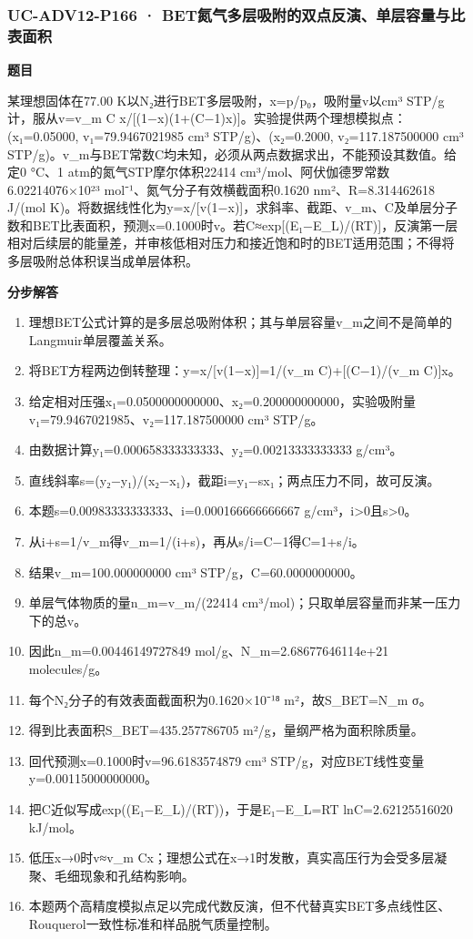 \documentclass[UTF8,11pt,a4paper]{ctexart}
\begin{document}
\subsubsection*{UC-ADV12-P166 · BET氮气多层吸附的双点反演、单层容量与比表面积}
\noindent\textbf{题目}\par
某理想固体在77.00 K以N₂进行BET多层吸附，x=p/p₀，吸附量v以cm³ STP/g计，服从v=v\_m C x/[(1−x)(1+(C−1)x)]。实验提供两个理想模拟点：(x₁=0.05000, v₁=79.9467021985 cm³ STP/g)、(x₂=0.2000, v₂=117.187500000 cm³ STP/g)。v\_m与BET常数C均未知，必须从两点数据求出，不能预设其数值。给定0 °C、1 atm的氮气STP摩尔体积22414 cm³/mol、阿伏伽德罗常数6.02214076×10²³ mol⁻¹、氮气分子有效横截面积0.1620 nm²、R=8.314462618 J/(mol K)。将数据线性化为y=x/[v(1−x)]，求斜率、截距、v\_m、C及单层分子数和BET比表面积，预测x=0.1000时v。若C≈exp[(E₁−E\_L)/(RT)]，反演第一层相对后续层的能量差，并审核低相对压力和接近饱和时的BET适用范围；不得将多层吸附总体积误当成单层体积。\par
\medskip\noindent\textbf{分步解答}
\begin{enumerate}
\item 理想BET公式计算的是多层总吸附体积；其与单层容量v\_m之间不是简单的Langmuir单层覆盖关系。
\item 将BET方程两边倒转整理：y=x/[v(1−x)]=1/(v\_m C)+[(C−1)/(v\_m C)]x。
\item 给定相对压强x₁=0.0500000000000、x₂=0.200000000000，实验吸附量v₁=79.9467021985、v₂=117.187500000 cm³ STP/g。
\item 由数据计算y₁=0.000658333333333、y₂=0.00213333333333 g/cm³。
\item 直线斜率s=(y₂−y₁)/(x₂−x₁)，截距i=y₁−sx₁；两点压力不同，故可反演。
\item 本题s=0.00983333333333、i=0.000166666666667 g/cm³，i>0且s>0。
\item 从i+s=1/v\_m得v\_m=1/(i+s)，再从s/i=C−1得C=1+s/i。
\item 结果v\_m=100.000000000 cm³ STP/g，C=60.0000000000。
\item 单层气体物质的量n\_m=v\_m/(22414 cm³/mol)；只取单层容量而非某一压力下的总v。
\item 因此n\_m=0.00446149727849 mol/g、N\_m=2.68677646114e+21 molecules/g。
\item 每个N₂分子的有效表面截面积为0.1620×10⁻¹⁸ m²，故S\_BET=N\_m σ。
\item 得到比表面积S\_BET=435.257786705 m²/g，量纲严格为面积除质量。
\item 回代预测x=0.1000时v=96.6183574879 cm³ STP/g，对应BET线性变量y=0.00115000000000。
\item 把C近似写成exp((E₁−E\_L)/(RT))，于是E₁−E\_L=RT lnC=2.62125516020 kJ/mol。
\item 低压x→0时v≈v\_m Cx；理想公式在x→1时发散，真实高压行为会受多层凝聚、毛细现象和孔结构影响。
\item 本题两个高精度模拟点足以完成代数反演，但不代替真实BET多点线性区、Rouquerol一致性标准和样品脱气质量控制。
\end{enumerate}
\end{document}
